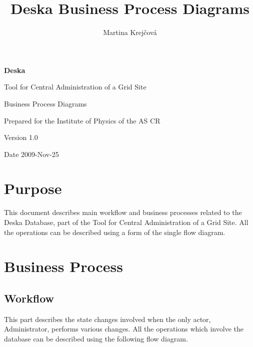 \documentclass[12pt]{article}
\author{Martina Krejčová}
\title{Deska Business Process Diagrams}
\begin{document}
{\Huge \textbf{Deska}}

\vspace{0.2in}

{\large Tool for Central Administration of a Grid Site}

\vspace{0.5in}

{\large Business Process Diagrams}

\vspace{0.2in}

{\large Prepared for the Institute of Physics of the AS CR}

\vspace{0.2in}

{\large Version 1.0}

\vspace{0.2in}

{\large Date 2009-Nov-25}

\vspace{0.5in}

\tableofcontents

\newpage


\section{Purpose}
This document describes main workflow and business processes related to the
Deska Database, part of the Tool for Central Administration of a Grid Site.
All the operations can be described using a form of the single flow diagram.


\section{Business Process}

\subsection{Workflow}
This part describes the state changes involved when the only actor,
Administrator, performs various changes.  All the operations which involve the
database can be described using the following flow diagram.
\end{document}
